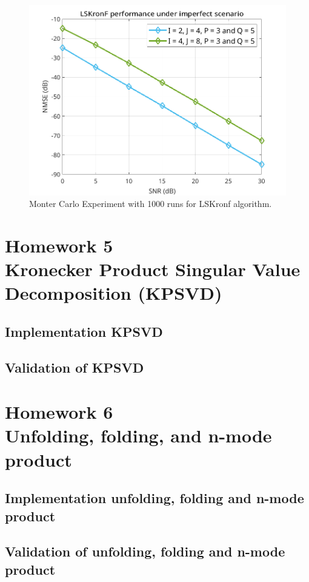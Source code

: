 \documentclass[a4paper,10pt]{article}
\begin{document}
    \begin{figure}[ht!]
        \centering 
        \includegraphics[width=0.75\linewidth]{figs/hw4.png} \par 
        \caption{Monter Carlo Experiment with 1000 runs for LSKronf algorithm.}
        \label{fig:hw4} 
    \end{figure}

\newpage
\section*{Homework 5 \\ Kronecker Product Singular Value Decomposition (KPSVD)}

    \subsection*{Implementation KPSVD}

    \subsection*{Validation of KPSVD}

\newpage
\section*{Homework 6 \\ Unfolding, folding, and n-mode product}

    \subsection*{Implementation unfolding, folding and n-mode product}

    \subsection*{Validation of unfolding, folding and n-mode product}
\end{document}
